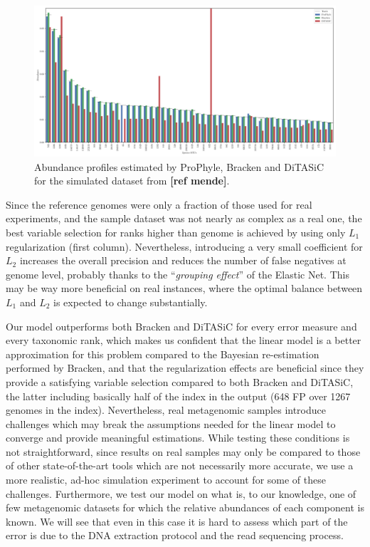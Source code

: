 \begin{figure}
  \caption{Abundance profiles estimated by ProPhyle, Bracken and DiTASiC for the simulated dataset from \textbf{[ref mende]}.}
  \centering
    \includegraphics[width=1\textwidth]{Figures/ab_mende.pdf}
\end{figure}

Since the reference genomes were only a fraction of those used for real experiments, and the sample dataset was not nearly as complex as a real one, the best variable selection for ranks higher than genome is achieved by using only $L_1$ regularization (first column).
Nevertheless, introducing a very small coefficient for $L_2$ increases the overall precision and reduces the number of false negatives at genome level, probably thanks to the ``\textit{grouping effect}'' of the Elastic Net. This may be way more beneficial on real instances, where the optimal balance between $L_1$ and $L_2$ is expected to change substantially.

Our model outperforms both Bracken and DiTASiC for every error measure and every taxonomic rank, which makes us confident that the linear model is a better approximation for this problem compared to the Bayesian re-estimation performed by Bracken, and that the regularization effects are beneficial since they provide a satisfying variable selection compared to both Bracken and DiTASiC, the latter including basically half of the index in the output (648 FP over 1267 genomes in the index). Nevertheless, real metagenomic samples introduce challenges which may break the assumptions needed for the linear model to converge and provide meaningful estimations. While testing these conditions is not straightforward, since results on real samples may only be compared to those of other state-of-the-art tools which are not necessarily more accurate, we use a more realistic, ad-hoc simulation experiment to account for some of these challenges. Furthermore, we test our model on what is, to our knowledge, one of few metagenomic datasets for which the relative abundances of each component is known. We will see that even in this case it is hard to assess which part of the error is due to the DNA extraction protocol and the read sequencing process.

